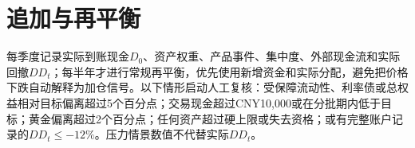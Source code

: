 \section{追加与再平衡}

每季度记录实际到账现金$D_0$、资产权重、产品事件、集中度、外部现金流和实际回撤$DD_t$；每半年才进行常规再平衡，优先使用新增资金和实际分配，避免把价格下跌自动解释为加仓信号。以下情形启动人工复核：受保障流动性、利率债或总权益相对目标偏离超过5个百分点；交易现金超过CNY10,000或在分批期内低于目标；黄金偏离超过2个百分点；任何资产超过硬上限或失去资格；或有完整账户记录的$DD_t\leq-12\%$。压力情景数值不代替实际$DD_t$。
